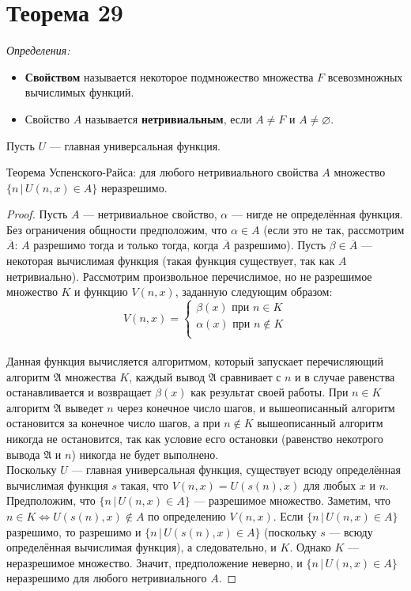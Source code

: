 \documentclass[a4paper,12pt]{article}
\begin{document}
	\section {Теорема 29} {
	\noindent
	\textit{Определения:}\begin{itemize}
	    \item \textbf{Свойством} называется некоторое подмножество множества $F$ всевозмножных вычислимых функций.
	    \item Свойство $A$ называется \textbf{нетривиальным}, если $A\ne F$ и $A\ne\varnothing$.
	\end{itemize}
	Пусть $U$ --- главная универсальная функция.
	}
	\begin{theorem}
	Теорема Успенского-Райса: для любого нетривиального свойства $A$ множество $\{n\, |\, U(n,x) \in A\}$ неразрешимо.
	\end{theorem}
	\begin{proof}
	Пусть $A$ --- нетривиальное свойство, $\alpha$ --- нигде не определённая функция. Без ограничения общности предположим, что $\alpha\in A$ (если это не так, рассмотрим $\overline{A}$: $A$ разрешимо тогда и только тогда, когда $\overline{A}$ разрешимо). Пусть $\beta\in\overline{A}$ --- некоторая вычислимая функция (такая функция существует, так как $A$ нетривиально). Рассмотрим произвольное перечислимое, но не разрешимое множество $K$ и функцию $V(n, x)$, заданную следующим образом:
	\bigskip
	$$ V(n, x) = 
	\begin{cases}
	\beta(x) \text{ при } n \in K\\
	\alpha(x) \text{ при } n \not\in K\\
	\end{cases}
	$$
	\medskip\\
	Данная функция вычисляется алгоритмом, который запускает перечисляющий алгоритм $\mathfrak{A}$ множества $K$, каждый вывод $\mathfrak{A}$ сравнивает с $n$ и в случае равенства останавливается и возвращает $\beta(x)$ как результат своей работы. При $n\in K$ алгоритм $\mathfrak{A}$ выведет $n$ через конечное число шагов, и вышеописанный алгоритм остановится за конечное число шагов, а при $n \not \in K$ вышеописанный алгоритм никогда не остановится, так как условие есго остановки (равенство некотрого вывода $\mathfrak{A}$ и $n$) никогда не будет выполнено.\\
	Поскольку $U$ --- главная универсальная функция, существует всюду определённая вычислимая функция $s$ такая, что $V(n,x)=U(s(n), x)$ для любых $x$ и $n$. Предположим, что $\{n\,|\,U(n, x)\in A\}$ --- разрешимое множество. Заметим, что $n \in K \Leftrightarrow U(s(n), x)\not\in A$ по определению $V(n, x)$. Если $\{n\,|\,U(n, x)\in A\}$ разрешимо, то разрешимо и $\{n\,|\,U(s(n), x)\in A\}$ (поскольку $s$ --- всюду определённая вычислимая функция), а следовательно, и $K$. Однако $K$ --- неразрешимое множество. Значит, предположение неверно, и $\{n\,|\,U(n, x)\in A\}$ неразрешимо для любого нетривиального $A$.
	\end{proof}
	
\end{document}
